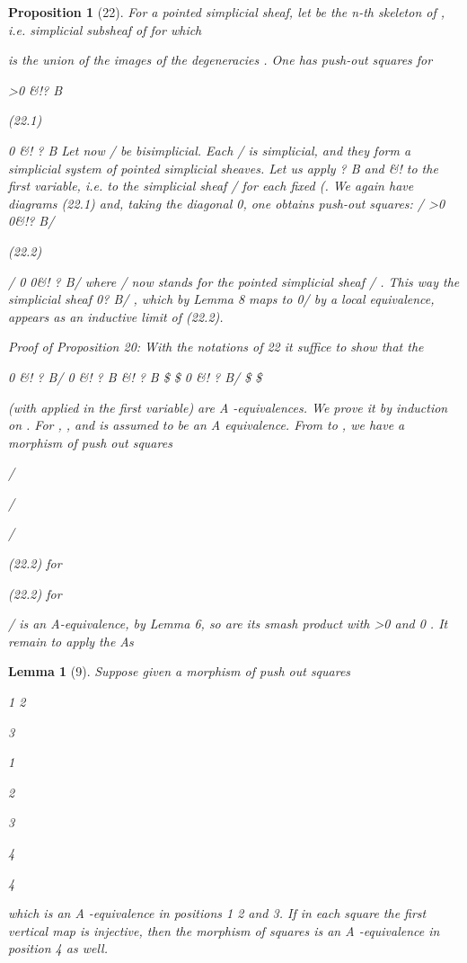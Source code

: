\documentclass[11pt,a4paper]{article}
\theoremstyle{plain}
\newtheorem{lemma}[theorem]{Lemma}
\newtheorem{proposition}[theorem]{Proposition}
\theoremstyle{definition}
\begin{document}
\begin{proposition}[22]
For a pointed simplicial sheaf, let 
be the n-th skeleton
of , i.e. simplicial subsheaf of for which

 is the union of the images
of the degeneracies
. One has push-out squares
 for





  >0   \&!? B







(22.1)

  0   \&! ? B
Let now / be bisimplicial. Each / is simplicial, and they form a simplicial system
of pointed simplicial sheaves. Let us apply ? B and \&! to the first variable, i.e. to
the simplicial sheaf /  for each fixed (. We again have diagrams (22.1) and,
taking the diagonal 0, one obtains push-out squares:
/  >0   0\&!? B/ 







(22.2)

/  0   0\&! ? B/ 
where / now stands for the pointed simplicial sheaf / . This way the simplicial
sheaf 0? B/ , which by Lemma 8 maps to 0/  by a local equivalence, appears
as an inductive limit of (22.2).

Proof of Proposition 20: With the notations of 22 it suffice to show that the

0 \&! ? B/  0 \&! ? B 
\&! ? B
\$
\$  0 \&! ? B/ 
\$ \$ 

(with 
applied in the first variable) are A -equivalences. We prove it by
induction on .
For
,
, and
is assumed to be an A equivalence. From to  , we have a morphism of push out squares

/

/

/

(22.2) for

(22.2) for

/    is an A-equivalence, by Lemma 6, so are its smash product with
>0  and 0  . It remain to apply the
As

\end{proposition}

\begin{lemma}[9]
Suppose given a morphism of push out squares

1  2

 
3 

1 


2

3 


4




4






which is an A -equivalence in positions 1 2 and 3. If in each square the first vertical
map is injective, then the morphism of squares is an A -equivalence in position 4 as
well.
\end{lemma}
\end{document}
